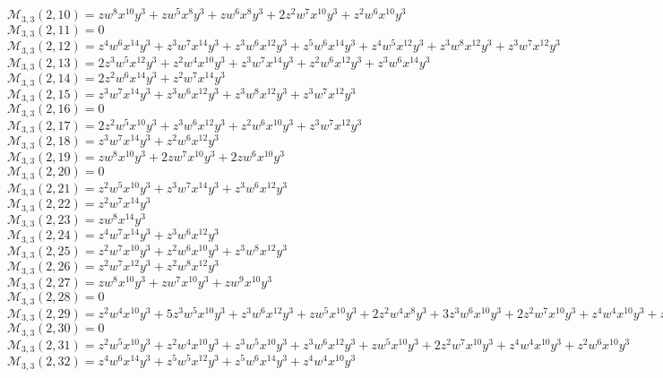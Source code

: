 \documentclass[12pt]{memoireuqam1.3}
\begin{document}
$\mathcal{M}_{3,3}(2,10)=zw^8x^{10}y^3+zw^5x^8y^3+zw^6x^8y^3+2z^2w^7x^{10}y^3+z^2w^6x^{10}y^3$\\
$\mathcal{M}_{3,3}(2,11)=0$\\
$\mathcal{M}_{3,3}(2,12)=z^4w^6x^{14}y^3+z^3w^7x^{14}y^3+z^3w^6x^{12}y^3+z^5w^6x^{14}y^3+z^4w^5x^{12}y^3+z^3w^8x^{12}y^3+z^3w^7x^{12}y^3$\\
$\mathcal{M}_{3,3}(2,13)=2z^3w^5x^{12}y^3+z^2w^4x^{10}y^3+z^3w^7x^{14}y^3+z^2w^6x^{12}y^3+z^3w^6x^{14}y^3$\\
$\mathcal{M}_{3,3}(2,14)=2z^2w^6x^{14}y^3+z^2w^7x^{14}y^3$\\
$\mathcal{M}_{3,3}(2,15)=z^3w^7x^{14}y^3+z^3w^6x^{12}y^3+z^3w^8x^{12}y^3+z^3w^7x^{12}y^3$\\
$\mathcal{M}_{3,3}(2,16)=0$\\
$\mathcal{M}_{3,3}(2,17)=2z^2w^5x^{10}y^3+z^3w^6x^{12}y^3+z^2w^6x^{10}y^3+z^3w^7x^{12}y^3$\\
$\mathcal{M}_{3,3}(2,18)=z^3w^7x^{14}y^3+z^2w^6x^{12}y^3$\\
$\mathcal{M}_{3,3}(2,19)=zw^8x^{10}y^3+2zw^7x^{10}y^3+2zw^6x^{10}y^3$\\
$\mathcal{M}_{3,3}(2,20)=0$\\
$\mathcal{M}_{3,3}(2,21)=z^2w^5x^{10}y^3+z^3w^7x^{14}y^3+z^3w^6x^{12}y^3$\\
$\mathcal{M}_{3,3}(2,22)=z^2w^7x^{14}y^3$\\
$\mathcal{M}_{3,3}(2,23)=zw^8x^{14}y^3$\\
$\mathcal{M}_{3,3}(2,24)=z^4w^7x^{14}y^3+z^3w^6x^{12}y^3$\\
$\mathcal{M}_{3,3}(2,25)=z^2w^7x^{10}y^3+z^2w^6x^{10}y^3+z^3w^8x^{12}y^3$\\
$\mathcal{M}_{3,3}(2,26)=z^2w^7x^{12}y^3+z^2w^8x^{12}y^3$\\
$\mathcal{M}_{3,3}(2,27)=zw^8x^{10}y^3+zw^7x^{10}y^3+zw^9x^{10}y^3$\\
$\mathcal{M}_{3,3}(2,28)=0$\\
$\mathcal{M}_{3,3}(2,29)=z^2w^4x^{10}y^3+5z^3w^5x^{10}y^3+z^3w^6x^{12}y^3+zw^5x^{10}y^3+2z^2w^4x^8y^3+3z^3w^6x^{10}y^3+2z^2w^7x^{10}y^3+z^4w^4x^{10}y^3+z^2w^5x^8y^3$\\
$\mathcal{M}_{3,3}(2,30)=0$\\
$\mathcal{M}_{3,3}(2,31)=z^2w^5x^{10}y^3+z^2w^4x^{10}y^3+z^3w^5x^{10}y^3+z^3w^6x^{12}y^3+zw^5x^{10}y^3+2z^2w^7x^{10}y^3+z^4w^4x^{10}y^3+z^2w^6x^{10}y^3$\\
$\mathcal{M}_{3,3}(2,32)=z^4w^6x^{14}y^3+z^5w^5x^{12}y^3+z^5w^6x^{14}y^3+z^4w^4x^{10}y^3$\\
\end{document}
